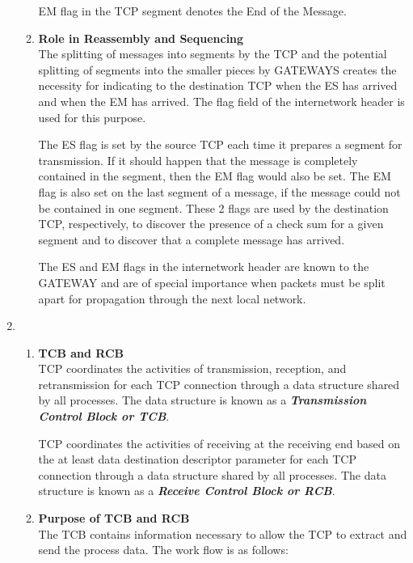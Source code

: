 \documentclass[12pt]{article}
\begin{document}
\begin{enumerate}
\begin{enumerate}[label=(\alph*)]
    EM flag in the TCP segment denotes the End of the Message.
    
    \item \textbf{Role in Reassembly and Sequencing} \\
    The splitting of messages into segments by the TCP and the potential splitting of segments into the smaller pieces by GATEWAYS creates the necessity for indicating to the destination TCP when the ES has arrived and when the EM has arrived. The flag field of the internetwork header is used for this purpose.

    The ES flag is set by the source TCP each time it prepares a segment for transmission. If it should happen that the message is completely contained in the segment, then the EM flag would also be set. The EM flag is also set on the last segment of a message, if the message could not be contained in one segment. These 2 flags are used by the destination TCP, respectively, to discover the presence of a check sum for a given segment and to discover that a complete message has arrived.

    The ES and EM flags in the internetwork header are known to the GATEWAY and are of special importance when packets must be split apart for propagation through the next local network.

    
\end{enumerate} %

\item
\begin{enumerate}[label=(\alph*)] %

\item \textbf{TCB and RCB} \\
TCP coordinates the activities of transmission, reception, and retransmission for each TCP connection through a data structure shared by all processes. The data structure is known as a \textit{\textbf{Transmission Control Block or TCB}}.

TCP coordinates the activities of receiving at the receiving end based on the at least data destination descriptor parameter for each TCP connection through a data structure shared by all processes. The data structure is known as a \textit{\textbf{Receive Control Block or RCB}}.

\item \textbf{Purpose of TCB and RCB} \\
The TCB contains information necessary to allow the TCP to extract and send the process data. The work flow is as follows: 


\end{enumerate}
\end{enumerate}
\end{document}
